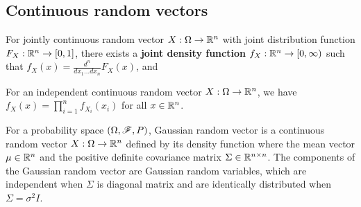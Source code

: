 \documentclass[letterpaper,10pt,english]{article}
\begin{document}
\subsection{Continuous random vectors}
\begin{defn} 
For jointly continuous random vector $X: \Omega \to \mathbb{R}^n$ with joint distribution function $F_X: \mathbb{R}^n \to [0,1]$, 
there exists a \textbf{joint density function} $f_X: \mathbb{R}^n \to [0,\infty)$ such that $f_X(x) = \frac{d^n}{dx_1\dots dx_n}F_X(x)$, and 
\end{defn}
\begin{rem}
For an independent continuous random vector $X: \Omega \to \mathbb{R}^n$, we have $f_X(x) = \prod_{i=1}^nf_{X_i}(x_i)$ for all $x \in \mathbb{R}^n$. 
\end{rem}
\begin{shaded}
\begin{exmp} 
For a probability space $(\Omega, \mathscr{F}, P)$, 
Gaussian random vector is a continuous random vector $X: \Omega \to \mathbb{R}^n$ defined by its density function
where the mean vector $\mu \in \mathbb{R}^n$ and the positive definite covariance matrix $\Sigma \in \mathbb{R}^{n \times n}$. 
The components of the Gaussian random vector are Gaussian random variables, 
which are independent when $\Sigma$ is diagonal matrix and are identically distributed when $\Sigma = \sigma^2 I$. 
\end{exmp}
\end{shaded}
\end{document}
